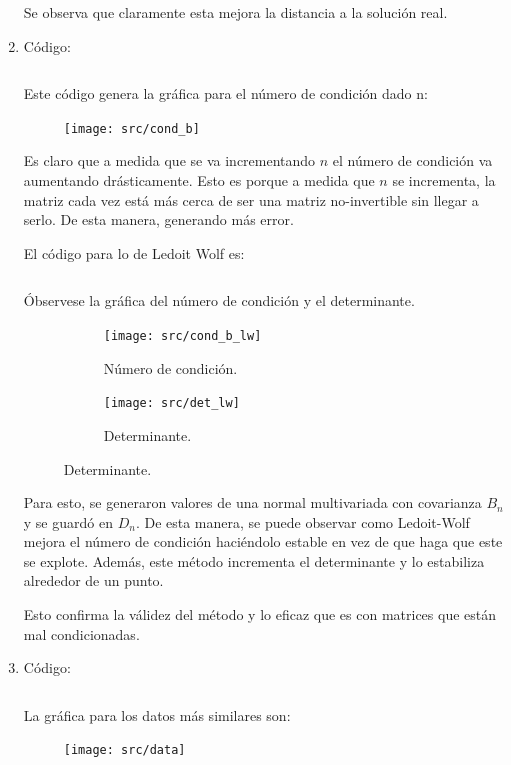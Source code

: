 \documentclass[fleqn]{article}
\begin{document}
\begin{enumerate}
    Se observa que claramente esta mejora la distancia a la solución real.

  \item Código: \inputminted[firstline=54, lastline=76]{python}{src/exam.py}

    Este código genera la gráfica para el número de condición dado n:
    \begin{figure}[H]
      \centering \texttt{[image: src/cond\_b]}
    \end{figure}

    Es claro que a medida que se va incrementando $n$ el número de condición va
    aumentando drásticamente. Esto es porque a medida que $n$ se incrementa, la
    matriz cada vez está más cerca de ser una matriz no-invertible sin llegar a
    serlo. De esta manera, generando más error.

    El código para lo de Ledoit Wolf es: \inputminted[firstline=79,
    lastline=98]{python}{src/exam.py}

    Óbservese la gráfica del número de condición y el determinante.
    \begin{figure}[H]
      \centering
      \begin{subfigure}[b]{0.45\textwidth}
        \centering \texttt{[image: src/cond\_b\_lw]}
        \caption{Número de condición.}
      \end{subfigure}
      \begin{subfigure}[b]{0.45\textwidth}
        \centering \texttt{[image: src/det\_lw]}
        \caption{Determinante.}
      \end{subfigure}
    \end{figure}

    Para esto, se generaron valores de una normal multivariada con covarianza
    $B_{n}$ y se guardó en $D_{n}$. De esta manera, se puede observar como
    Ledoit-Wolf mejora el número de condición haciéndolo estable en vez de que
    haga que este se explote. Además, este método incrementa el determinante y
    lo estabiliza alrededor de un punto.

    Esto confirma la válidez del método y lo eficaz que es con matrices que
    están mal condicionadas.

  \item Código: \inputminted[firstline=94, lastline=154]{python}{src/exam.py}

  La gráfica para los datos más similares son:
  \begin{figure}[H]
    \centering
    \texttt{[image: src/data]}
  \end{figure}


\end{enumerate}
\end{document}
